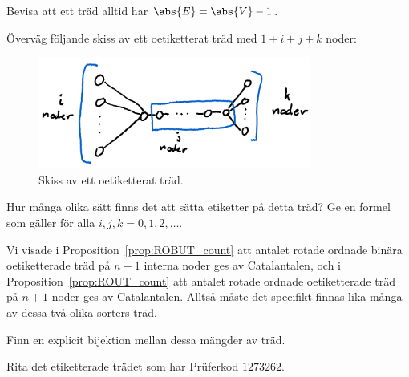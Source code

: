 \documentclass[nobib]{tufte-handout}
\begin{document}
\begin{xca}
    Bevisa att ett träd alltid har $\abs{E} = \abs{V} - 1$.
\end{xca}

\begin{xca}
    Överväg följande skiss av ett oetiketterat träd med $1 + i + j + k$ noder:
    \begin{figure}
        \centering
        \includegraphics[width=0.8\textwidth]{graphics/exercise_label_unlabelled_tree.png}
        \caption{Skiss av ett oetiketterat träd.}
    \end{figure}

    Hur många olika sätt finns det att sätta etiketter på detta träd? Ge en formel som gäller för alla $i, j, k = 0, 1, 2,\ldots$.
\end{xca}

\begin{xca}
    Vi visade i Proposition~\ref{prop:ROBUT_count} att antalet rotade ordnade binära oetiketterade träd på $n-1$ interna noder ges av Catalantalen, och i Proposition~\ref{prop:ROUT_count} att antalet rotade ordnade oetiketterade träd på $n+1$ noder ges av Catalantalen. Alltså måste det specifikt finnas lika många av dessa två olika sorters träd.

    Finn en explicit bijektion mellan dessa mängder av träd.
\end{xca}

\begin{xca}
    Rita det etiketterade trädet som har Prüferkod $1273262$.
\end{xca}
\end{document}
